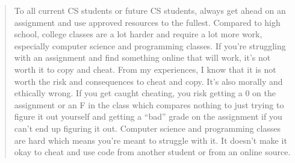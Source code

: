 \documentclass[12pt]{scrartcl}
\begin{document}
\begin{quote}
	To all current CS students or future CS students, always get ahead on an assignment and use approved resources to the fullest.  Compared to high school, college classes are a lot harder and require a lot more work, especially computer science and programming classes.  If you're struggling with an assignment and find something online that will work, it's not worth it to copy and cheat.  From my experiences, I know that it is not worth the risk and consequences to cheat and copy.  It's also morally and ethically wrong.  If you get caught cheating, you risk getting a 0 on the assignment or an F in the class which compares nothing to just trying to figure it out yourself and getting a ``bad'' grade on the assignment if you can't end up figuring it out.  Computer science and programming classes are hard which means you're meant to struggle with it.  It doesn't make it okay to cheat and use code from another student or from an online source.
\end{quote}
\end{document}
